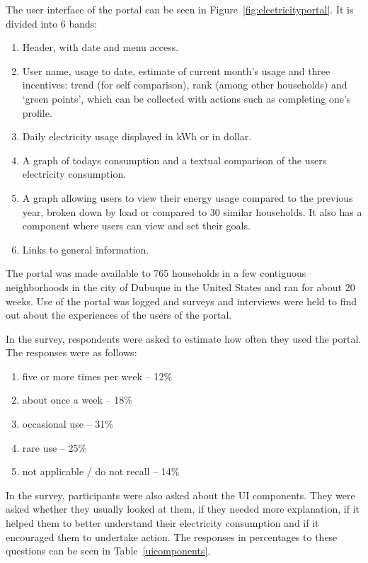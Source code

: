 \documentclass[journal]{vgtc}                %
\begin{document}
The user interface of the portal can be seen in Figure~\ref{fig:electricityportal}. It is divided into 6 bands:
\begin{enumerate}
\item Header, with date and menu access.
\item User name, usage to date, estimate of current month's usage and three incentives: trend (for self comparison), rank (among other households) and `green points', which can be collected with actions such as completing one's profile.
\item Daily electricity usage displayed in kWh or in dollar.
\item A graph of todays consumption and a textual comparison of the users electricity consumption.
\item A graph allowing users to view their energy usage compared to the previous year, broken down by load or compared to 30 similar households. It also has a component where users can view and set their goals.
\item Links to general information.
\end{enumerate}

The portal was made available to 765 households in a few contiguous neighborhoods in the city of Dubuque in the United States and ran for about 20 weeks. Use of the portal was logged and surveys and interviews were held to find out about the experiences of the users of the portal.

In the survey, respondents were asked to estimate how often they used the portal. The responses were as follows:
\begin{enumerate}
\item five or more times per week -- 12\%
\item about once a week -- 18\%
\item occasional use -- 31\%
\item rare use -- 25\%
\item not applicable / do not recall -- 14\%
\end{enumerate}

In the survey, participants were also asked about the UI components. They were asked whether they usually looked at them, if they needed more explanation, if it helped them to better understand their electricity consumption and if it encouraged them to undertake action. The responses in percentages to these questions can be seen in Table~\ref{uicomponents}.
\end{document}
